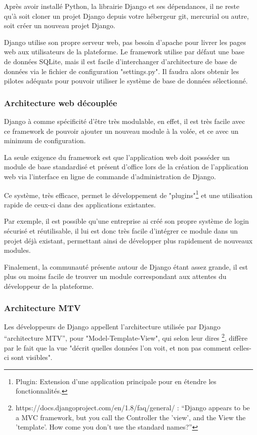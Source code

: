 \documentclass[12pt,table,a4paper]{report}
\begin{document}
Après avoir installé Python, la librairie Django et ses dépendances, il ne reste qu'à soit cloner un projet Django depuis votre hébergeur git, mercurial ou autre, soit créer un nouveau projet Django.

Django utilise son propre serveur web, pas besoin d'apache pour livrer les pages web aux utilisateurs de la plateforme. Le framework utilise par défaut une base de données SQLite, mais il est facile d'interchanger d'architecture de base de données via le fichier de configuration "settings.py". Il faudra alors obtenir les pilotes adéquats pour pouvoir utiliser le système de base de données sélectionné.

\subsubsection{Architecture web découplée}
Django à comme spécificité d'être très modulable, en effet, il est très facile avec ce framework de pouvoir ajouter un nouveau module à la volée, et ce avec un minimum de configuration.

La seule exigence du framework est que l'application web doit posséder un module de base standardisé et présent d'office lors de la création de l'application web via l'interface en ligne de commande d'administration de Django.

Ce système, très efficace, permet le développement de "plugins"\footnote{Plugin: Extension d'une application principale pour en étendre les fonctionnalités.} et une utilisation rapide de ceux-ci dans des applications existantes.

Par exemple, il est possible qu'une entreprise ai créé son propre système de login sécurisé et réutilisable, il lui est donc très facile d'intégrer ce module dans un projet déjà existant, permettant ainsi de développer plus rapidement de nouveaux modules.

Finalement, la communauté présente autour de Django étant assez grande, il est plus ou moins facile de trouver un module correspondant aux attentes du développeur de la plateforme.

\subsubsection{Architecture MTV}
Les développeurs de Django appellent l'architecture utilisée par Django "`architecture MTV"', pour "Model-Template-View", qui selon leur dires \footnote{https://docs.djangoproject.com/en/1.8/faq/general/ : "`Django appears to be a MVC framework, but you call the Controller the 'view', and the View the 'template'. How come you don’t use the standard names?"'}, diffère par le fait que la vue "décrit quelles données l'on voit, et non pas comment celles-ci sont visibles".
\end{document}

